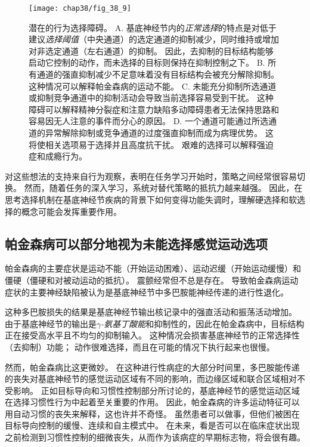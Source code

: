 \begin{figure}[htbp]
	\centering
	\texttt{[image: chap38/fig\_38\_9]}
	\caption{潜在的行为选择障碍。
		A. 基底神经节内的\textit{正常选择}的特点是对低于建议\textit{选择阈值}（中央通道）的选定通道的抑制减少，同时维持或增加对非选定通道（左右通道）的抑制。
		因此，去抑制的目标结构能够启动它控制的动作，而未选择的目标则保持在抑制控制之下。
		B. 所有通道的强直抑制减少不足意味着没有目标结构会被充分解除抑制。
		这种情况可以解释帕金森病的运动不能。
		C. 未能充分抑制所选通道或抑制竞争通道中的抑制活动会导致当前选择容易受到干扰。
		这种障碍可以解释精神分裂症和注意力缺陷多动障碍患者无法保持思路和容易因无人注意的事件而分心的原因。
		D. 一个通道可能通过所选通道的异常解除抑制或竞争通道的过度强直抑制而成为病理优势。
		这将使相关选项易于选择并且高度抗干扰。
		艰难的选择可以解释强迫症和成瘾行为。}
	\label{fig:38_9}
\end{figure}


对这些想法的支持来自行为观察，表明在任务学习开始时，策略之间经常很容易切换。
然而，随着任务的深入学习，系统对替代策略的抵抗力越来越强。
因此，在思考选择机制在基底神经节疾病的背景下如何变得功能失调时，理解硬选择和软选择的概念可能会发挥重要作用。



\subsection{帕金森病可以部分地视为未能选择感觉运动选项}

帕金森病的主要症状是运动不能（开始运动困难）、运动迟缓（开始运动缓慢）和僵硬（僵硬和对被动运动的抵抗）。
震颤经常但不总是存在。
导致帕金森病运动症状的主要神经缺陷被认为是基底神经节中多巴胺能神经传递的进行性退化。


这种多巴胺损失的结果是基底神经节输出核记录中的强直活动和振荡活动增加。
由于基底神经节的输出是\textit{$\gamma$-氨基丁酸能}和抑制性的，因此在帕金森病中，目标结构正在接受高水平且不均匀的抑制输入。
这种情况会损害基底神经节的正常选择性（去抑制）功能；
动作很难选择，而且在可能的情况下执行起来也很慢。


然而，帕金森病比这更微妙。
在这种进行性病症的大部分时间里，多巴胺能传递的丧失对基底神经节的感觉运动区域有不同的影响，而边缘区域和联合区域相对不受影响。
正如目标导向和习惯性控制部分所讨论的，基底神经节的感觉运动区域在选择习惯性行为中起着至关重要的作用。
因此，帕金森病的许多运动特征可以用自动习惯的丧失来解释，这也许并不奇怪。
虽然患者可以做事，但他们被困在目标导向控制的缓慢、连续和自主模式中。
在未来，看是否可以在临床症状出现之前检测到习惯性控制的细微丧失，从而作为该病症的早期标志物，将会很有趣。



